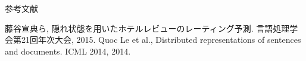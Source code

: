 \documentclass[unicode,10pt]{beamer}
\newlength{\mycolumnwidth}
\begin{document}
\begin{frame}[t]
\begin{columns}[onlytextwidth,t]
\begin{column}{\mycolumnwidth}
  参考文献
  
  \begin{thebibliography}{9}
      藤谷宣典ら,
      隠れ状態を用いたホテルレビューのレーティング予測.
      言語処理学会第21回年次大会, 2015.
      Quoc Le et al.,
      Distributed representations of sentences and documents.
      ICML 2014, 2014.
  \end{thebibliography}
\end{column}

\end{columns}
\end{frame}
\end{document}
